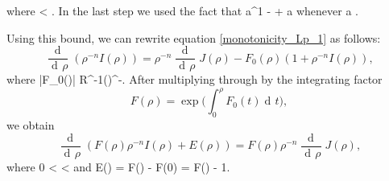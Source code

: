 \documentclass[a4paper, 11pt]{article}
\theoremstyle{plain}
\theoremstyle{definition}
\theoremstyle{remark}
\DeclareMathOperator{\diff}{d \!}
\numberwithin{equation}{subsection}
\def\({}
\def\){}
\begin{document}
where \(\rho < \). In the last step we used the fact that \(a^{1 - }  + a\) whenever \(a \).

Using this bound, we can rewrite equation \eqref{monotonicity_Lp_1} as follows:
\begin{equation}
\frac{\!\diff}{\diff\rho}(\rho^{-n}I(\rho)) = \rho^{-n}\frac{\!\diff}{\diff\rho}J(\rho) - F_0(\rho)(1 + \rho^{-n}I(\rho)),
\end{equation}
where \(|F_0(\rho)| \kappa\Lambda R^{-1}\bigl(\bigr)^{-}\). After multiplying through by the integrating factor
\begin{equation}
F(\rho) = \exp\biggl(\int_{0}^{\rho}F_0(t)\diff t\biggr),
\end{equation}
we obtain
\begin{equation}
\frac{\!\diff}{\diff\rho}(F(\rho)\rho^{-n}I(\rho) + E(\rho)) = F(\rho)\rho^{-n}\frac{\!\diff}{\diff\rho}J(\rho),
\end{equation}
where \(0 < \rho < \) and \(E(\rho) = F(\rho) - F(0) = F(\rho) - 1\).
\end{document}
